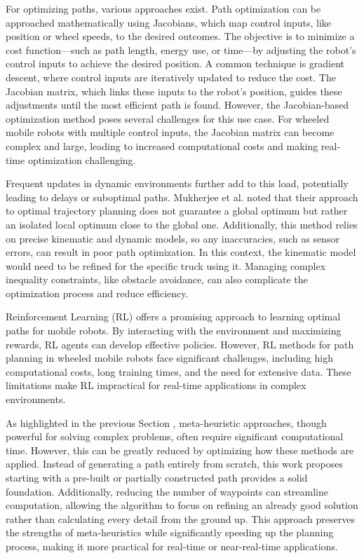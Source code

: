 For optimizing paths, various approaches exist.
Path optimization can be approached mathematically using Jacobians, which map control inputs, like position or wheel 
speeds, to the desired outcomes. The objective is to minimize a cost function—such as path length, energy use, 
or time—by adjusting the robot's control inputs to achieve the desired position. A common technique is gradient descent, 
where control inputs are iteratively updated to reduce the cost. The Jacobian matrix, which links these 
inputs to the robot's position, guides these adjustments until the most efficient path is found. However, the Jacobian-based 
optimization method poses several challenges for this use case. For wheeled mobile robots with multiple control inputs, 
the Jacobian matrix can become complex and large, leading to increased computational costs and making real-time 
optimization challenging. 

Frequent updates in dynamic environments further add to this load, potentially leading to delays or suboptimal paths. 
Mukherjee et al. \cite{R44} noted that their approach to optimal trajectory planning does not guarantee a global 
optimum but rather an isolated local optimum close to the global one. Additionally, this method relies on precise 
kinematic and dynamic models, so any inaccuracies, such as sensor errors, can result in poor path optimization. 
In this context, the kinematic model would need to be refined for the specific truck using it. Managing complex inequality 
constraints, like obstacle avoidance, can also complicate the optimization process and reduce efficiency.

Reinforcement Learning (RL) offers a promising approach to learning optimal paths for mobile robots. By interacting 
with the environment and maximizing rewards, RL agents can develop effective policies. However, RL methods for 
path planning in wheeled mobile robots face significant challenges, including high computational costs, long 
training times, and the need for extensive data. These limitations make RL impractical for real-time applications 
in complex environments.

As highlighted in the previous Section , meta-heuristic approaches, though powerful for solving complex problems, 
often require significant computational time. However, this can be greatly reduced by optimizing how these 
methods are applied. Instead of generating a path entirely from scratch, this work proposes starting with a pre-built 
or partially constructed path provides a solid foundation. Additionally, reducing the number of waypoints 
can streamline computation, allowing the algorithm to focus on refining an already good solution rather 
than calculating every detail from the ground up. This approach preserves the strengths of meta-heuristics 
while significantly speeding up the planning process, making it more practical for real-time or near-real-time 
applications.

